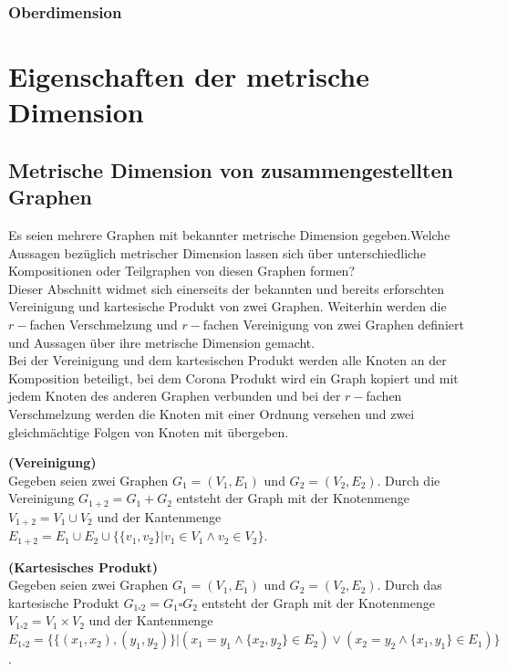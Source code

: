 \subsection{Oberdimension}


\chapter{Eigenschaften der metrische Dimension}
\section{Metrische Dimension von zusammengestellten Graphen}
\label{kapallg}
Es seien mehrere Graphen mit bekannter metrische Dimension gegeben.\newline Welche Aussagen bezüglich metrischer Dimension lassen sich über unterschiedliche Kompositionen oder Teilgraphen von diesen Graphen formen?\\Dieser Abschnitt widmet sich einerseits der bekannten und bereits erforschten Vereinigung und kartesische Produkt von zwei Graphen. Weiterhin werden die $r-$fachen Verschmelzung und $r-$fachen Vereinigung von zwei Graphen definiert und Aussagen über ihre metrische Dimension gemacht.\\Bei der Vereinigung und dem kartesischen Produkt werden alle Knoten an der Komposition beteiligt, bei dem Corona Produkt wird ein Graph kopiert und mit jedem Knoten des anderen Graphen verbunden und bei der $r-$fachen Verschmelzung werden die Knoten mit einer Ordnung versehen und zwei gleichmächtige Folgen von Knoten mit übergeben.   
\begin{defi}{\textbf{(Vereinigung)}}\\
Gegeben seien zwei Graphen $G_1=(V_1,E_1)$ und $G_2=(V_2,E_2)$. Durch die Vereinigung $G_{1+2}=G_1+G_2$ entsteht der Graph mit der Knotenmenge $V_{1+2}=V_1 \cup V_2$ und der Kantenmenge $E_{1+2}= E_1 \cup E_2 \cup \{\{v_1,v_2\}| v_1 \in V_1 \wedge v_2 \in V_2\}$.
\end{defi}

\begin{defi}{\textbf{(Kartesisches Produkt)}}\\
Gegeben seien zwei Graphen $G_1=(V_1,E_1)$ und $G_2=(V_2,E_2)$. Durch das kartesische Produkt $G_{1\square 2}=G_1 \square G_2$ entsteht der Graph mit der Knotenmenge $V_{1 \square 2}=V_1 \times V_2$ und der Kantenmenge $E_{1\square 2}= \{\{(x_1,x_2),(y_1,y_2)\}| (x_1=y_1 \wedge \{x_2,y_2\} \in E_2)\vee (x_2=y_2 \wedge \{x_1,y_1\} \in E_1)\}$. 
\end{defi}

